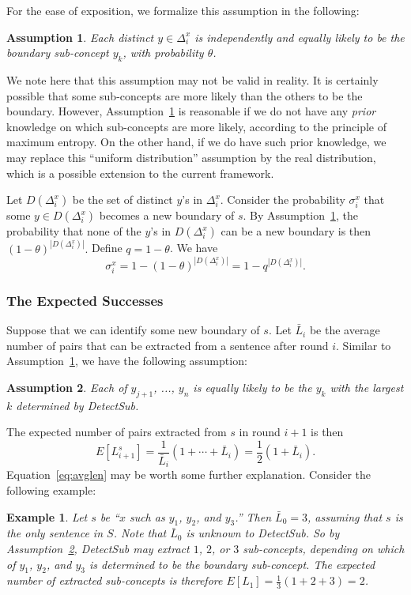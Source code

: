 \documentclass[10pt,journal,cspaper,compsoc]{IEEEtran}
\newtheorem{example}{Example}
\newtheorem{assumption}{Assumption}
\begin{document}
For the ease of exposition, we formalize this assumption in the following:
\begin{assumption}\label{assumption:uniform}
Each distinct $y\in\Delta_i^x$ is independently and equally likely to be the boundary sub-concept $y_k$, with probability $\theta$.
\end{assumption}
We note here that this assumption may not be valid in reality. It is certainly possible that some sub-concepts are more likely than the others to be the boundary. However, Assumption~\ref{assumption:uniform} is reasonable if we do not have any \emph{prior} knowledge on which sub-concepts are more likely, according to the principle of maximum entropy. On the other hand, if we do have such prior knowledge, we may replace this ``uniform distribution'' assumption by the real distribution, which is a possible extension to the current framework.

Let $D(\Delta_i^x)$ be the set of distinct $y$'s in $\Delta_i^x$.
Consider the probability $\sigma_i^x$ that some $y\in D(\Delta_i^x)$ becomes a new boundary of $s$.
By Assumption~\ref{assumption:uniform}, the probability that none of the $y$'s in $D(\Delta_i^x)$ can be a new boundary is then $(1-\theta)^{|D(\Delta_i^x)|}.$ Define $q=1-\theta$. We have
\begin{equation}\label{eq:sigmaix}
\sigma_i^x=1-(1-\theta)^{|D(\Delta_i^x)|}=1-q^{|D(\Delta_i^x)|}.
\end{equation}

\subsubsection{The Expected Successes}

Suppose that we can identify some new boundary of $s$. Let $\bar{L}_i$ be the average number of pairs that can be extracted from a sentence after round $i$. Similar to Assumption~\ref{assumption:uniform}, we have the following assumption:
\begin{assumption}\label{assumption:uniform2}
Each of $y_{j+1}$, ..., $y_n$ is equally likely to be the $y_k$ with the largest $k$ determined by \emph{DetectSub}.
\end{assumption}
The expected number of pairs extracted from $s$ in round $i+1$ is then
\begin{equation}\label{eq:avglen}
E[L_{i+1}^s]=\frac{1}{\bar{L}_i}(1+\cdots+\bar{L}_i)=\frac{1}{2}(1+\bar{L}_i).
\end{equation}
Equation~\ref{eq:avglen} may be worth some further explanation. Consider the following example:
\begin{example}
Let $s$ be ``$x$ such as $y_1$, $y_2$, and $y_3$.''
Then $\bar{L}_0 = 3$, assuming that $s$ is the only sentence in $S$. Note that $\bar{L}_0$ is unknown to \emph{DetectSub}.
So by Assumption~\ref{assumption:uniform2}, \emph{DetectSub} may extract $1$, $2$, or $3$ sub-concepts, depending on which of $y_1$, $y_2$, and $y_3$ is determined to be the boundary sub-concept. The expected number of extracted sub-concepts is therefore $E[L_1]=\frac{1}{3}(1 + 2 + 3) = 2$.
\end{example}
\end{document}
